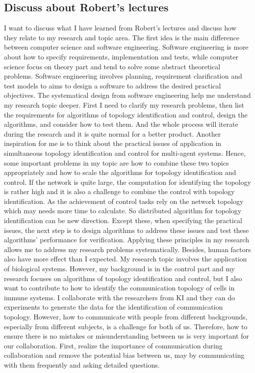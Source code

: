 \documentclass[11pt]{article}
\begin{document}
\subsection*{Discuss about Robert’s lectures}
I want to discuss what I have learned from Robert’s lectures and discuss how they relate to my research and topic area. The first idea is the main difference between computer science and software engineering. Software engineering is more about how to specify requirements, implementation and tests, while computer science focus on theory part and tend to solve some abstract theoretical problems. Software engineering involves planning, requirement clarification and test models to aims to design a software to address the desired practical objectives. The systematical design from software engineering help me understand my research topic deeper. First I need to clarify my research problems, then list the requirements for algorithms of topology identification and control, design the algorithms, and consider how to test them. And the whole process will iterate during the research and it is quite normal for a better product. Another inspiration for me is to think about the practical issues of application in simultaneous topology identification and control for multi-agent systems.  Hence, some important problems in my topic are how to combine these two topics appropriately and how to scale the algorithms for topology identification and control. If the network is quite large, the computation for identifying the topology is rather high and it is also a challenge to combine the control with topology identification. As the achievement of control tasks rely on the network topology which may needs more time to calculate. So distributed algorithm for topology identification  can be new direction. Except these, when specifying the practical issues, the next step is to design algorithms to address these issues and test these algorithms’ performance for verification. Applying these principles in my research allows me to address my research problems systematically. Besides, human factors also have more effect than I expected. My research topic involves the application of biological systems. However, my background is in the control part and my research focuses on algorithms of topology identification and control, but I also want to contribute to how to identify the communication topology of cells in immune systems. I collaborate with the researchers from KI and they can do experiments to generate the data for the identification of communication topology. However, how to communicate with people from different backgrounds, especially from different subjects, is a challenge for both of us. Therefore, how to ensure there is no mistakes or misunderstanding between us is very important for our collaboration. First, realize the importance of communication during collaboration and remove the potential bias between us, may by communicating with them frequently and asking detailed questions. 
\\
\end{document}
